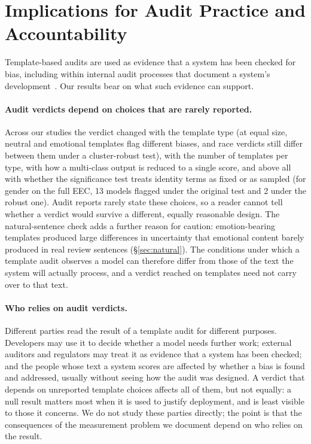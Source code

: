 \documentclass[runningheads]{llncs}
\begin{document}
\section{Implications for Audit Practice and Accountability}\label{sec:accountability}
Template-based audits are used as evidence that a system has been checked for
bias, including within internal audit processes that document a system's
development~\cite{raji2020}. Our results bear on what such evidence can
support.

\paragraph{Audit verdicts depend on choices that are rarely reported.} Across
our studies the verdict changed with the template type (at equal size, neutral
and emotional templates flag different biases, and race verdicts still differ
between them under a cluster-robust test), with the number of templates per
type, with how a multi-class output is reduced to a single score, and above all
with whether the significance test treats identity terms as fixed or as
sampled (for gender on the full EEC, 13 models flagged under the original test
and 2 under the robust one). Audit reports rarely state these choices, so a
reader cannot tell whether a verdict would survive a different, equally
reasonable design. The natural-sentence check adds a further reason for
caution: emotion-bearing templates produced large differences in uncertainty
that emotional content barely produced in real review sentences
(\S\ref{sec:natural}). The conditions under which a template audit observes a
model can therefore differ from those of the text the system will actually
process, and a verdict reached on templates need not carry over to that text.

\paragraph{Who relies on audit verdicts.} Different parties read the result of a
template audit for different purposes. Developers may use it to decide whether a
model needs further work; external auditors and regulators may treat it as
evidence that a system has been checked; and the people whose text a system
scores are affected by whether a bias is found and addressed, usually without
seeing how the audit was designed. A verdict that depends on unreported
template choices affects all of them, but not equally: a null result matters
most when it is used to justify deployment, and is least visible to those it
concerns. We do not study these parties directly; the point is that the
consequences of the measurement problem we document depend on who relies on
the result.
\end{document}
